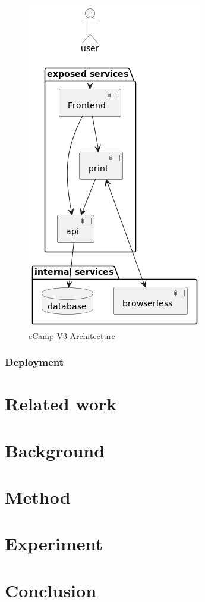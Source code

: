 \documentclass[conference]{IEEEtran}
\begin{document}
\begin{figure}[h!]
	\includegraphics[height=\columnwidth]{sections/assets/ecamp3-architecture}
	\caption{eCamp V3 Architecture}
	\label{fig:ecamp3-architecture}
\end{figure}

\subsubsection{Deployment}

\section{Related work}

\section{Background}

\section{Method}

\section{Experiment}

\section{Conclusion}




\date{\today}



\newpage
%
\end{document}
